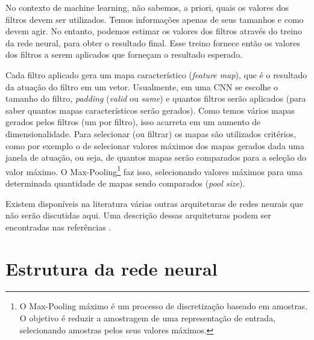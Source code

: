\documentclass[a4paper,12pt,oneside]{book}
\begin{document}
\par No contexto de machine learning, não sabemos, a priori, quais os valores dos filtros devem ser utilizados. Temos informações apenas de seus tamanhos e como devem agir. No entanto, podemos estimar os valores dos filtros através do treino da rede neural, para obter o resultado final. Esse treino fornece então os valores dos filtros a serem aplicados que forneçam o resultado esperado.  

\par Cada filtro aplicado gera um mapa característico (\textit{feature map}), que é o resultado da atuação do filtro em um vetor. Usualmente, em uma CNN se escolhe o tamanho do filtro, \textit{padding} (\textit{valid} ou \textit{same}) e quantos filtros serão aplicados (para saber quantos mapas característicos serão gerados). Como temos vários mapas gerados pelos filtros (um por filtro), isso acarreta em um aumento de dimensionalidade. Para selecionar (ou filtrar) os mapas são utilizados critérios, como por exemplo o de selecionar valores máximos dos mapas gerados dada uma janela de atuação, ou seja, de quantos mapas serão comparados para a seleção do valor máximo. O Max-Pooling\footnote{O Max-Pooling máximo é um processo de discretização baseado em amostras. O objetivo é reduzir a amostragem de uma representação de entrada, selecionando amostras pelos seus valores máximos.} faz isso, selecionando valores máximos para uma determinada quantidade de mapas sendo comparados (\textit{pool size}).


\par Existem disponíveis na literatura várias outras arquiteturas de redes neurais que não serão discutidas aqui. Uma descrição dessas arquiteturas podem ser encontradas nas referências \cite{rbfbook, RNN_fund}.

\section{Estrutura da rede neural}
\end{document}
